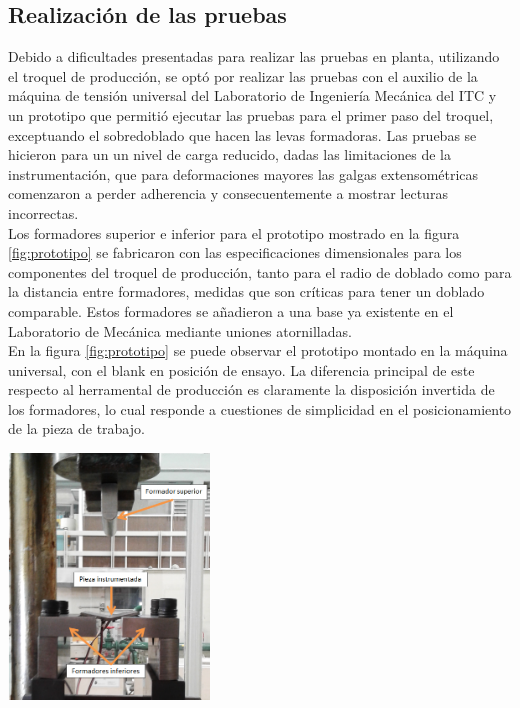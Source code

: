 \subsection{Realización de las pruebas}

Debido a dificultades presentadas para realizar las pruebas en planta, utilizando el troquel de producción, 
se optó por realizar las pruebas con el auxilio de la máquina de tensión universal del Laboratorio de 
Ingeniería Mecánica del ITC y un prototipo que permitió ejecutar las pruebas para el primer paso del troquel, 
exceptuando el sobredoblado que hacen las levas formadoras. Las pruebas se hicieron para un 
un nivel de carga reducido, dadas las limitaciones de la instrumentación, que para deformaciones mayores 
las galgas extensométricas comenzaron a perder adherencia y consecuentemente a mostrar lecturas incorrectas.\\

Los formadores superior e inferior para el prototipo mostrado en la figura \ref{fig:prototipo} se fabricaron 
con las especificaciones dimensionales para los componentes del troquel de producción, tanto para el radio 
de doblado como para la distancia entre formadores, medidas que son críticas para tener un doblado comparable. 
Estos formadores se añadieron a una base ya existente en el Laboratorio de Mecánica mediante uniones 
atornilladas.\\

En la figura \ref{fig:prototipo} se puede observar el prototipo montado en la máquina universal, con 
el blank en posición de ensayo. La diferencia principal de este respecto al herramental de producción 
es claramente la disposición invertida de los formadores, lo cual responde a cuestiones de simplicidad 
en el posicionamiento de la pieza de trabajo.

\begin{center}
\includegraphics[width=0.4\textwidth]{src/ch3/prototipo.png}
\label{fig:prototipo}
\end{center}

